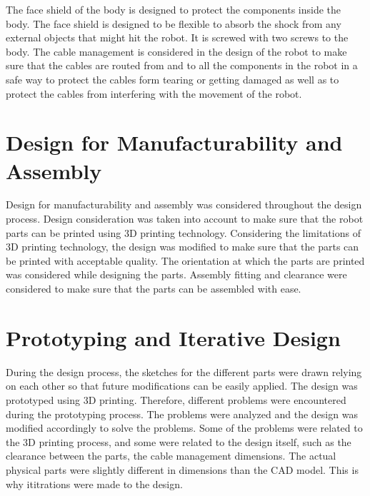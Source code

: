 The face shield of the body is designed to protect the components inside the body.
The face shield is designed to be flexible to absorb the shock from any external objects that might hit the robot. It is screwed with two screws to the body.
The cable management is considered in the design of the robot to make sure that the cables are routed from and to all the components in the robot in a safe way to protect the cables form tearing or getting damaged as well as to protect the cables from interfering with the movement of the robot.



\section{Design for Manufacturability and Assembly}
Design for manufacturability and assembly was considered throughout the design process.
Design consideration was taken into account to make sure that the robot parts can be printed using 3D printing technology.
Considering the limitations of 3D printing technology, the design was modified to make sure that the parts can be printed with acceptable quality.
The orientation at which the parts are printed was considered while designing the parts.
Assembly fitting and clearance were considered to make sure that the parts can be assembled with ease.

\section{Prototyping and Iterative Design}

During the design process, the sketches for the different parts were drawn relying on each other so that future modifications can be easily applied.
 The design was prototyped using 3D printing.
Therefore, different problems were encountered during the prototyping process.
The problems were analyzed and the design was modified accordingly to solve the problems.
Some of the problems were related to the 3D printing process, and some were related to the design itself, such as the clearance between the parts, the cable management dimensions.
The actual physical parts were slightly different in dimensions than the CAD model.
This is why ititrations were made to the design.

